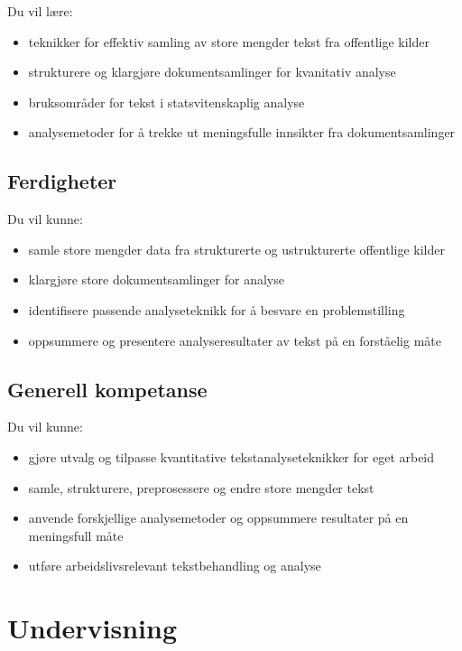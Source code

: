 \documentclass[12pt,a4paper,norsk]{article}
\begin{document}
Du vil lære:
\begin{itemize}
  \item teknikker for effektiv samling av store mengder tekst fra offentlige kilder
  \item strukturere og klargjøre dokumentsamlinger for kvanitativ analyse
  \item bruksområder for tekst i statsvitenskaplig analyse
  \item analysemetoder for å trekke ut meningsfulle innsikter fra dokumentsamlinger
\end{itemize}

\subsection*{Ferdigheter}

Du vil kunne:
\begin{itemize}
  \item samle store mengder data fra strukturerte og ustrukturerte offentlige kilder
  \item klargjøre store dokumentsamlinger for analyse
  \item identifisere passende analyseteknikk for å besvare en problemstilling
  \item oppsummere og presentere analyseresultater av tekst på en forståelig måte
\end{itemize}


\subsection*{Generell kompetanse}

Du vil kunne:

\begin{itemize}
  \item gjøre utvalg og tilpasse kvantitative tekstanalyseteknikker for eget arbeid
  \item samle, strukturere, preprosessere og endre store mengder tekst
  \item anvende forskjellige analysemetoder og oppsummere resultater på en meningsfull måte
  \item utføre arbeidslivsrelevant tekstbehandling og analyse
\end{itemize}


\section*{Undervisning}
\end{document}
